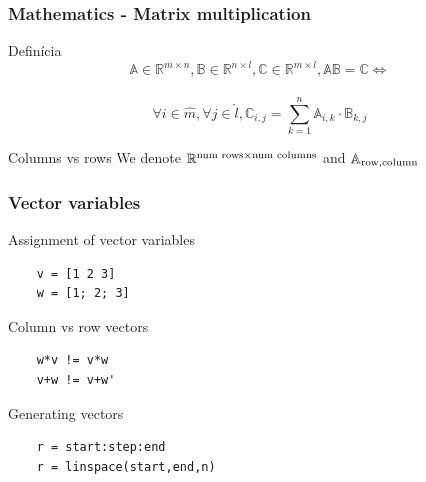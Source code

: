 \documentclass{beamer}
\begin{document}
\begin{frame}[fragile]
\frametitle{Mathematics - Matrix multiplication}
  \begin{block}{Definícia}
    $$\mathbb{A} \in \mathbb{R}^{m\times n}, \mathbb{B} \in \mathbb{R}^{n\times l}, \mathbb{C} \in \mathbb{R}^{m\times l}, \mathbb{A} \mathbb{B} = \mathbb{C} \iff$$ \\
    $$\forall i \in \hat{m}, \forall j \in \hat{l}, \mathbb{C}_{i,j} = \sum_{k = 1}^n \mathbb{A}_{i,k} \cdot \mathbb{B}_{k,j}$$
  \end{block}
  
  \begin{alertblock}{Columns vs rows}
   We denote $\mathbb{R}^{\textnormal{num rows} \times \textnormal{num columns}}$
   and $\mathbb{A}_{\textnormal{row}, \textnormal{column}}$
  \end{alertblock}
  
\end{frame}

\begin{frame}[fragile]
\frametitle{Vector variables}
  \begin{block}{Assignment of vector variables}
  \begin{verbatim}
    v = [1 2 3]
    w = [1; 2; 3]  \end{verbatim}
  \end{block}
  
  \pause
  
  \begin{alertblock}{Column vs row vectors}
  \begin{verbatim}
    w*v != v*w
    v+w != v+w' \end{verbatim}
  \end{alertblock}
  
  \pause

  \begin{block}{Generating vectors}
  \begin{verbatim}
    r = start:step:end
    r = linspace(start,end,n)  \end{verbatim}
  \end{block}
\end{frame}
\end{document}

